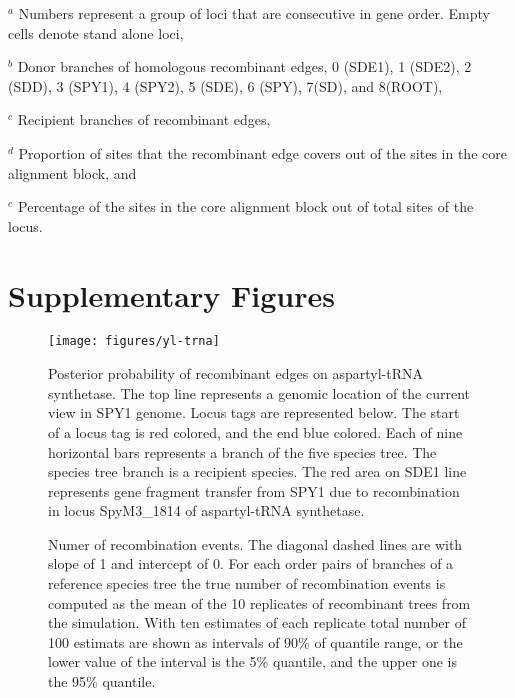 \documentclass[english]{article}
\begin{document}
\begin{table}
{$^a$ Numbers represent a group of loci that are consecutive in gene order. Empty
cells denote stand alone loci,

$^b$ Donor branches of homologous recombinant edges, 0 (SDE1), 1 (SDE2), 2
(SDD), 3 (SPY1), 4 (SPY2), 5 (SDE), 6 (SPY), 7(SD), and 8(ROOT),

$^c$ Recipient branches of recombinant edges,

$^d$ Proportion of sites that the recombinant edge covers out of the sites in
the core alignment block, and

$^e$ Percentage of the sites in the core alignment block out of total sites of
the locus.
}

\end{table}
\clearpage{}


\section*{Supplementary Figures}

\clearpage{}

\begin{figure}
\texttt{[image: figures/yl-trna]}
\caption{\label{fig:muts}Posterior probability of recombinant edges on 
aspartyl-tRNA
synthetase.  The
top line represents a genomic location of the current view in SPY1 genome. Locus
tags are represented below. The start of a locus tag is red colored, and the end
blue colored. Each of nine horizontal bars represents a branch of the five
species tree. The species tree branch is a recipient species.
The red area on SDE1 line represents gene fragment transfer from
SPY1 due to recombination in locus SpyM3\_1814 of aspartyl-tRNA synthetase.}
\end{figure}
\clearpage{}%

\begin{figure}
\caption{\label{fig:h1}Numer of recombination events. The diagonal dashed
lines are with slope of 1 and intercept of 0. For each order
pairs of branches of a reference species tree the true number of recombination
events is computed as the mean of the 10 replicates of recombinant
trees from the simulation. With ten estimates of each replicate total
number of 100 estimats are shown as intervals of 90\% of quantile
range, or the lower value of the interval is the 5\% quantile, and
the upper one is the 95\% quantile. }
\end{figure}
\clearpage{}%
\end{document}
